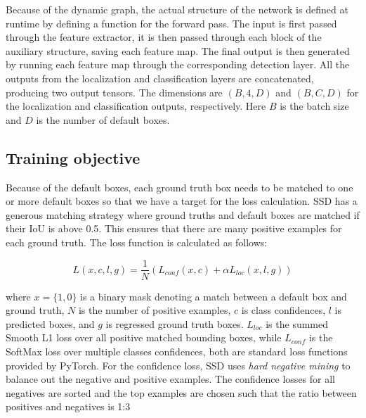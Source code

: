 Because of the dynamic graph, the actual structure of the network is defined at runtime by defining a function for the forward pass.
The input is first passed through the feature extractor, it is then passed through each block of the auxiliary structure, saving each feature map.
The final output is then generated by running each feature map through the corresponding detection layer.
All the outputs from the localization and classification layers are concatenated, producing two output tensors.
The dimensions are \(\left(B,4,D\right) \) and \(\left(B,C,D\right) \) for the localization and classification outputs, respectively.
Here \(B\) is the batch size and \(D\) is the number of default boxes.


\subsection{Training objective}
Because of the default boxes, each ground truth box needs to be matched to one or more default boxes so that we have a target for the loss calculation.
SSD has a generous matching strategy where ground truths and default boxes are matched if their IoU is above 0.5.
This ensures that there are many positive examples for each ground truth.
The loss function is calculated as follows:

\[L(x,c,l,g)=\frac{1}{N}\left( L_{conf}(x,c) + \alpha L_{loc}(x,l,g)\right) \]

where \( x=\{1,0\} \) is a binary mask denoting a match between a default box and ground truth, \( N \) is the number of positive examples, \( c \) is class confidences, \( l \) is predicted boxes, and \( g \) is regressed ground truth boxes.  \( L_{loc} \) is the summed Smooth L1 loss over all positive matched bounding boxes, while \( L_{conf} \) is the SoftMax loss over multiple classes confidences, both are standard loss functions provided by PyTorch.
For the confidence loss, SSD uses \textit{hard negative mining} to balance out the negative and positive examples.
The confidence losses for all negatives are sorted and the top examples are chosen such that the ratio between positives and negatives is 1:3


